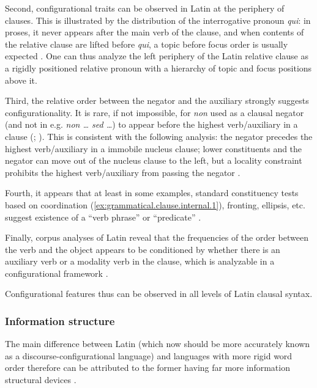 \documentclass[a4paper, oneside, 12pt]{report}
\newcommand*{\citepage}[1]{p.~{#1}}
\newcommand*{\citepages}[1]{pp.~{#1}}
\newcommand{\form}[1]{\emph{#1}}
\begin{document}
Second, configurational traits can be observed in Latin at the periphery of clauses.
This is illustrated by the distribution of the interrogative pronoun \form{qui}:
in proses, it never appears after the main verb of the clause,
and when contents of the relative clause are lifted before \form{qui},
a topic before focus order is usually expected \citep[\citepages{19-20}]{danckaert2017development}.
One can thus analyze the left periphery of the Latin relative clause as 
a rigidly positioned relative pronoun with a hierarchy of topic and focus positions above it.

Third, the relative order between the negator and the auxiliary strongly suggests configurationality.
It is rare, if not impossible, for \form{non} used as a clausal negator (and not in e.g. \form{non \dots{} sed \dots}) to appear before the highest verb/auxiliary in a clause (\citealt[\citepages{39-44}]{danckaert2017development}; \citealt[\citepage{183}]{devine2006latin}).
This is consistent with the following analysis: 
the negator precedes the highest verb/auxiliary in a immobile nucleus clause;
lower constituents and the negator can move out of the nucleus clause to the left,
but a locality constraint prohibits the highest verb/auxiliary from passing the negator
\citep[\citepages{60-62}]{danckaert2017development}.

Fourth, it appears that at least in some examples, standard constituency tests based on coordination (\ref{ex:grammatical.clause.internal.1}), fronting, ellipsis, etc. suggest existence of a ``verb phrase'' or ``predicate'' \citep[\citepages{68-73}]{danckaert2017development}.

Finally, corpus analyses of Latin reveal that the frequencies of the order between the verb and the object appears to be conditioned by whether there is an auxiliary verb or a modality verb in the clause, which is analyzable in a configurational framework \citep[\citepages{293-295}]{danckaert2017development}.

Configurational features thus can be observed in all levels of Latin clausal syntax.

\subsubsection{Information structure}

The main difference between Latin (which now should be more accurately known as a discourse-configurational language) and languages with more rigid word order therefore can be attributed to the former having far more information structural devices \citep[\citepage{15}]{danckaert2017development}.
\end{document}
